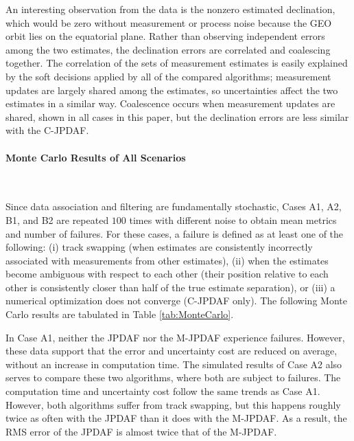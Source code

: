 An interesting observation from the data is the nonzero estimated declination, which would be zero without measurement or process noise because the GEO orbit lies on the equatorial plane.
Rather than observing independent errors among the two estimates, the declination errors are correlated and coalescing together.
The correlation of the sets of measurement estimates is easily explained by the soft decisions applied by all of the compared algorithms; measurement updates are largely shared among the estimates, so uncertainties affect the two estimates in a similar way.
Coalescence occurs when measurement updates are shared, shown in all cases in this paper, but the declination errors are less similar with the C-JPDAF.


















\paragraph*{Monte Carlo Results of All Scenarios}\ 

Since data association and filtering are fundamentally stochastic, Cases A1, A2, B1, and B2 are repeated $100$ times with different noise to obtain mean metrics and number of failures.
For these cases, a failure is defined as at least one of the following: (i) track swapping (when estimates are consistently incorrectly associated with measurements from other estimates), (ii) when the estimates become ambiguous with respect to each other (their position relative to each other is consistently closer than half of the true estimate separation), or (iii) a numerical optimization does not converge (C-JPDAF only).
The following Monte Carlo results are tabulated in Table \ref{tab:MonteCarlo}.

In Case A1, neither the JPDAF nor the M-JPDAF experience failures.
However, these data support that the error and uncertainty cost are reduced on average, without an increase in computation time.
The simulated results of Case A2 also serves to compare these two algorithms, where both are subject to failures.
The computation time and uncertainty cost follow the same trends as Case A1.
However, both algorithms suffer from track swapping, but this happens roughly twice as often with the JPDAF than it does with the M-JPDAF. As a result, the RMS error of the JPDAF is almost twice that of the M-JPDAF.

